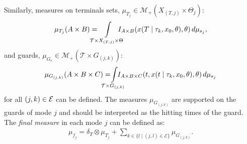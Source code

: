 Similarly, measures on terminals sets, $\mu_{T_j}\in \mathcal M_+(X_{(T,j)}\times \Theta_j)$:
\begin{align}
\mu_{T_j}(A\times B)= \hspace*{-4mm}\int\limits_{\mathcal T\times X_{(T,j)}\times \Theta}\hspace*{-4mm}I_{A\times B}(x(T\mid \tau_k,x_0,\theta),\theta)\,d\mu_{s_{j}},
\end{align}
and guards, $\mu_{ G_{e}}\in \mathcal M_+(\mathcal T\times  G_{(j,k)})$:
\begin{align}
\mu_{G_{(j,k)}}(A\times B\times C)=\hspace*{-5mm}\int\limits_{\mathcal T\times G_{(j,k)}}\hspace*{-5mm}I_{A\times B\times C}(t,x(t\mid \tau_k,x_0,\theta),\theta)\,d\mu_{s_{j}}
\end{align}
for all $(j,k) \in {\cal E}$ can be defined. 
The measures $\mu_{ G_{(j,k)}}$ are supported on the guards of mode $j$ and should be interpreted as the hitting times of the guard.
The {\em final measure} in each mode $j$ can be defined as:
\begin{align}
  \mu_{f_j}=\delta_T\otimes \mu_{T_j}+\sum_{k\in\{l\mid (j,l)\in \mathcal E\}}\mu_{ G_{(j,k)}}.
\label{eq:mu_T}
\end{align}

